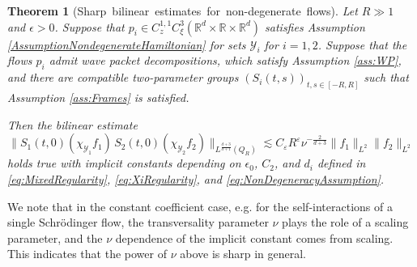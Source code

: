 \documentclass{amsart}
\newtheorem{theorem}{Theorem}[section]
\theoremstyle{definition}
\newcommand{\R}{\mathbb{R}}
\begin{document}
\begin{theorem}[Sharp~bilinear~estimates~for~non-degenerate~flows]
\label{thm:GeneralizationBilinearParaboloid}
Let $R \gg 1$ and $\epsilon > 0$. Suppose that $p_i \in C_{z}^{1,1} C^3_{\xi}(\R^d \times \R \times \R^d)$ satisfies Assumption \ref{AssumptionNondegenerateHamiltonian} for sets $\mathcal{Y}_i$ for $i=1,2$. Suppose that the flows $p_i$ admit wave packet decompositions, which satisfy Assumption \ref{ass:WP}, and there are compatible two-parameter groups $(S_i(t,s))_{t,s \in [-R,R]}$ such that Assumption \ref{ass:Frames} is satisfied.

Then the bilinear estimate 
\begin{equation}\label{eq:bi-nondeg}
\big\| S_1(t,0) (\chi_{\mathcal{Y}_1} f_1) \, S_2(t,0) (\chi_{\mathcal{Y}_2} f_2) \big\|_{L^{\frac{d+3}{d+1}}(Q_R)} \lesssim C_\varepsilon R^{\varepsilon} \nu^{-\frac{2}{d+3}} \| f_1 \|_{L^2} \| f_2 \|_{L^2}
\end{equation}
 holds true with implicit constants depending on $\epsilon_0$, $C_2$, and $d_i$ defined in \eqref{eq:MixedRegularity}, \eqref{eq:XiRegularity}, and \eqref{eq:NonDegeneracyAssumption}.
\end{theorem}
We note that in the constant coefficient case, e.g. for the self-interactions of a single Schr\"odinger flow, the transversality parameter $\nu$ plays the role of a scaling parameter, and the $\nu$ dependence of the implicit constant comes from scaling. This indicates that 
the power of $\nu$ above is sharp in general.


\smallskip
\end{document}
